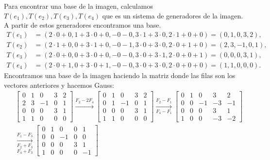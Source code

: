 \begin{enumerate}[topsep=6pt, itemsep=.4cm]
    Para encontrar una base de la imagen, calculamos $T(e_1),T(e_2),T(e_3),T(e_4)$ que es un sistema de generadores de la imagen. A partir de estos generadores encontramos una base.
    \begin{align*}
        T(e_1) &= (2\cdot 0+0,1+3\cdot 0+0,-0-0,3\cdot 1+3\cdot 0,2\cdot 1+0+0) = (0,1,0,3,2), \\
        T(e_2) &= (2\cdot 1+0,0+3\cdot 1+0,-0-1,3\cdot 0+3\cdot 0,2\cdot 0+1+0)= (2,3,-1,0,1), \\
        T(e_3) &= (2\cdot 0+0,0+3\cdot 0+0,-0-0,3\cdot 0+3\cdot 1,2\cdot 0+0+1)= (0,0,0,3,1), \\
        T(e_4) &= (2\cdot 0+1,0+3\cdot 0+1,-0-0,3\cdot 0+3\cdot 0,2\cdot 0+0+0)= (1,1,0,0,0).
    \end{align*}
    Encontramos una base de la imagen haciendo la matriz donde las filas son los vectores anteriores y hacemos Gauss:
    \begin{align*}
        &\begin{bmatrix}
            0 & 1 & 0 &3 &2\\
            2 & 3 & -1 &0 &1\\
            0 & 0 & 0 &3 &1\\
            1 & 1 & 0 &0 &0
        \end{bmatrix}
        \stackrel{F_2-2F_4}{\longrightarrow}
        \begin{bmatrix}
            0 & 1 & 0 &3 &2\\
            0 & 1 & -1 &0 &1\\
            0 & 0 & 0 &3 &1\\
            1 & 1 & 0 &0 &0
        \end{bmatrix}
        \underset{F_4-F_1}{\stackrel{F_2-F_1}{\longrightarrow}}
        \begin{bmatrix}
            0 & 1 & 0 &3 &2\\
            0 & 0 & -1 &-3 &-1\\
            0 & 0 & 0 &3 &1\\
            1 & 0 & 0 &-3 &-2
        \end{bmatrix} \\
        &\underset{F_4+F_3}{\underset{F_2+F_3}{\stackrel{F_1-F_3}{\longrightarrow}}}
        \begin{bmatrix}
            0 & 1 & 0 &0 &1\\
            0 & 0 & -1 &0 &0\\
            0 & 0 & 0 &3 &1\\
            1 & 0 & 0 &0 &-1

\end{bmatrix}
\end{align*}
\end{enumerate}
